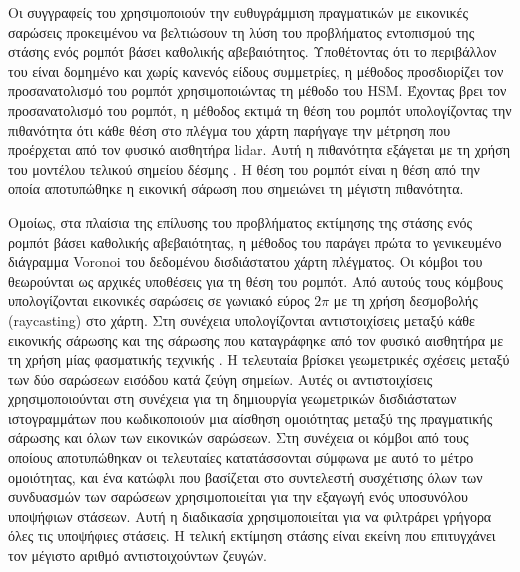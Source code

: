 Οι συγγραφείς του \cite{Zhu2011a} χρησιμοποιούν την ευθυγράμμιση πραγματικών με
εικονικές σαρώσεις προκειμένου να βελτιώσουν τη λύση του προβλήματος εντοπισμού
της στάσης ενός ρομπότ βάσει καθολικής αβεβαιότητος. Υποθέτοντας ότι το
περιβάλλον του είναι δομημένο και χωρίς κανενός είδους συμμετρίες, η μέθοδος
προσδιορίζει τον προσανατολισμό του ρομπότ χρησιμοποιώντας τη μέθοδο του HSM.
Έχοντας βρει τον προσανατολισμό του ρομπότ, η μέθοδος εκτιμά τη θέση του ρομπότ
υπολογίζοντας την πιθανότητα ότι κάθε θέση στο πλέγμα του χάρτη παρήγαγε την
μέτρηση που προέρχεται από τον φυσικό αισθητήρα lidar. Αυτή η πιθανότητα
εξάγεται με τη χρήση του μοντέλου τελικού σημείου δέσμης
\cite{thrun2005probabilistic}. Η θέση του ρομπότ είναι η θέση από την οποία
αποτυπώθηκε η εικονική σάρωση που σημειώνει τη μέγιστη πιθανότητα.

Ομοίως, στα πλαίσια της επίλυσης του προβλήματος εκτίμησης της στάσης ενός
ρομπότ βάσει καθολικής αβεβαιότητας, η μέθοδος του \cite{Park2014a} παράγει
πρώτα το γενικευμένο διάγραμμα Voronoi του δεδομένου δισδιάστατου χάρτη
πλέγματος. Οι κόμβοι του θεωρούνται ως αρχικές υποθέσεις για τη θέση του
ρομπότ. Από αυτούς τους κόμβους υπολογίζονται εικονικές σαρώσεις σε γωνιακό
εύρος $2\pi$ με τη χρήση δεσμοβολής (raycasting) στο χάρτη. Στη συνέχεια
υπολογίζονται αντιστοιχίσεις μεταξύ κάθε εικονικής σάρωσης και της σάρωσης που
καταγράφηκε από τον φυσικό αισθητήρα με τη χρήση μίας φασματικής τεχνικής
\cite{Leordeanu2005a}. Η τελευταία βρίσκει γεωμετρικές σχέσεις μεταξύ των δύο
σαρώσεων εισόδου κατά ζεύγη σημείων. Αυτές οι αντιστοιχίσεις χρησιμοποιούνται
στη συνέχεια για τη δημιουργία γεωμετρικών δισδιάστατων ιστογραμμάτων που
κωδικοποιούν μια αίσθηση ομοιότητας μεταξύ της πραγματικής σάρωσης και όλων των
εικονικών σαρώσεων. Στη συνέχεια οι κόμβοι από τους οποίους αποτυπώθηκαν οι
τελευταίες κατατάσσονται σύμφωνα με αυτό το μέτρο ομοιότητας, και ένα κατώφλι
που βασίζεται στο συντελεστή συσχέτισης όλων των συνδυασμών των σαρώσεων
χρησιμοποιείται για την εξαγωγή ενός υποσυνόλου υποψήφιων στάσεων. Αυτή η
διαδικασία χρησιμοποιείται για να φιλτράρει γρήγορα όλες τις υποψήφιες στάσεις.
Η τελική εκτίμηση στάσης είναι εκείνη που επιτυγχάνει τον μέγιστο αριθμό
αντιστοιχούντων ζευγών.

